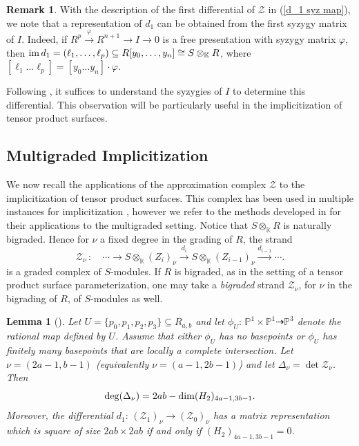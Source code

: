 \documentclass[reqno]{amsart}
\newtheorem{lemma}[thm]{Lemma}
\numberwithin{equation}{section}
\theoremstyle{definition}
\newtheorem{rem}[thm]{Remark}
\def\K{\mathbb{K}}
\def\P{\mathbb{P}}
\def\Z{\mathcal{Z}}
\def\dim{\mathop{\rm dim}}
\def\im{\mathop{\rm im}}
\begin{document}
\begin{rem}\label{syzygies to approx comp}
With the description of the first differential of $\Z$ in (\ref{d_1 syz map}), we note that a representation of $d_1$ can be obtained from the first syzygy matrix of $I$. Indeed, if $R^p\overset{\varphi}{\rightarrow} R^{n+1} \rightarrow I\rightarrow 0$ is a free presentation with syzygy matrix $\varphi$, then $\im d_1 = (\ell_1,\ldots,\ell_p) \subseteq R[y_0,\ldots,y_n] \cong S\otimes_\K R$, where $[\ell_1\ldots \ell_p] = [y_0\ldots y_n]\cdot \varphi$.
\end{rem}





Following , it suffices to understand the syzygies of $I$ to determine this differential. This observation will be particularly useful in the implicitization of tensor product surfaces.







\subsection{Multigraded Implicitization}


We now recall the applications of the approximation complex $\Z$ to the implicitization of tensor product surfaces. This complex has been used in multiple instances for implicitization \cite{BDD09,BC05,Chardin06}, however we refer to the methods developed in \cite{Botbol11} for their applications to the multigraded setting. Notice that $S\otimes_\K R$ is naturally bigraded. Hence 
for $\nu$ a fixed degree in the grading of $R$, the strand 
$$\Z_\nu\,: \quad \cdots \longrightarrow S\otimes_\K (Z_i)_\nu \overset{d_i}{\longrightarrow} S\otimes_\K (Z_{i-1})_\nu \overset{d_{i-1}}{\longrightarrow} \cdots.$$
is a graded complex of $S$-modules. If $R$ is bigraded, as in the setting of a tensor product surface parameterization, one may take a \textit{bigraded} strand $\Z_\nu$, for $\nu$ in the bigrading of $R$, of $S$-modules as well. 





\begin{lemma}[{\cite[7.3]{Botbol11}}]\label{Botbol det Z}
Let $U=\{p_0,p_1,p_2,p_3\} \subseteq R_{a,b}$ and let $\phi_U:\,\P^1\times\P^1 \dashrightarrow \P^3$ denote the rational map defined by $U$. Assume that either $\phi_U$ has no basepoints or $\phi_U$ has finitely many basepoints that are locally a complete intersection. Let $\nu=(2a-1,b-1)$ (equivalently $\nu =(a-1,2b-1)$) and let $\Delta_\nu= \det \Z_\nu$. Then
$$\deg (\Delta_\nu) = 2ab - \dim (H_2)_{4a-1,3b-1}.$$
Moreover, the differential $d_1:\, (\Z_1)_\nu \rightarrow (\Z_0)_\nu$ has a matrix representation which is square of size $2ab\times 2ab$ if and only if $(H_2)_{4a-1,3b-1}=0$.
\end{lemma}
\end{document}
